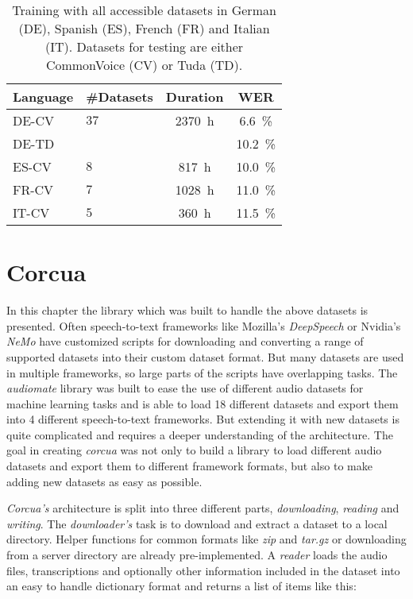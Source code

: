 \begin{table}[!htbp]
	\caption{Training with all accessible datasets  in German (DE), Spanish (ES), French (FR) and Italian (IT). Datasets for testing are either CommonVoice (CV) or Tuda (TD).}
	\label{tab:tads}
	\centering
	\begin{tabular}{llcc}
		\toprule
		\textbf{Language} & \textbf{\#Datasets} & \textbf{Duration} & \textbf{WER} \\
		\midrule
		DE-CV & $37$ & \SI{2370}{\hour}  & \SI{6.6}{\percent} \\
		DE-TD &  &   & \SI{10.2}{\percent} \\
		\midrule
		ES-CV & $8$ & \SI{817}{\hour}  & \SI{10.0}{\percent} \\
		FR-CV & $7$ & \SI{1028}{\hour}  & \SI{11.0}{\percent} \\
		IT-CV & $5$ & \SI{360}{\hour}  & \SI{11.5}{\percent} \\
		\bottomrule
	\end{tabular}
\end{table}

\section{Corcua}
\label{sec:corcua}

In this chapter the library which was built to handle the above datasets is presented.
Often speech-to-text frameworks like Mozilla's \textit{DeepSpeech} or Nvidia's \textit{NeMo} have customized scripts for downloading and converting a range of supported datasets into their custom dataset format. But many datasets are used in multiple frameworks, so large parts of the scripts have overlapping tasks.
The \textit{audiomate} \cite{AUDMAT} library was built to ease the use of different audio datasets for machine learning tasks and is able to load 18 different datasets and export them into 4 different speech-to-text frameworks. But extending it with new datasets is quite complicated and requires a deeper understanding of the architecture.
The goal in creating \textit{corcua} was not only to build a library to load different audio datasets and export them to different framework formats, but also to make adding new datasets as easy as possible.

\vspace{9pt}
\textit{Corcua's} architecture is split into three different parts, \textit{downloading}, \textit{reading} and \textit{writing}.
The \textit{downloader's} task is to download and extract a dataset to a local directory. Helper functions for common formats like \textit{zip} and \textit{tar.gz} or downloading from a server directory are already pre-implemented.
A \textit{reader} loads the audio files, transcriptions and optionally other information included in the dataset into an easy to handle dictionary format and returns a list of items like this:


